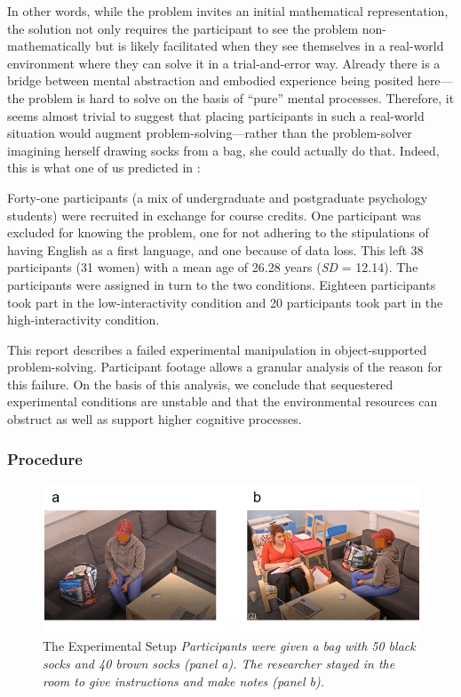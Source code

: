 \documentclass[twocolumn, issue, empirical, authordate,drafn]{jote-new-article}
\begin{document}
In other words, while the problem invites an initial mathematical representation, the solution not only requires the participant to see the problem non-mathematically but is likely facilitated when they see themselves in a real-world environment where they can solve it in a trial-and-error way. Already there is a bridge between mental abstraction and embodied experience being posited here---the problem is hard to solve on the basis of ``pure'' mental processes. Therefore, it seems almost trivial to suggest that placing participants in such a real-world situation would augment problem-solving---rather than the problem-solver imagining herself drawing socks from a bag, she could actually do that. Indeed, this is what one of us predicted in \textcite{Vallee-Tourangeau2020}: 


Forty-one participants (a mix of undergraduate and postgraduate psychology students) were recruited in exchange for course credits. One participant was excluded for knowing the problem, one for not adhering to the stipulations of having English as a first language, and one because of data loss. This left 38 participants (31 women) with a mean age of 26.28 years (\emph{SD} = 12.14). The participants were assigned in turn to the two conditions. Eighteen participants took part in the low-interactivity condition and 20 participants took part in the high-interactivity condition. 

\begin{takeHomeMessage}
This report describes a failed experimental manipulation in object-supported problem-solving. Participant footage allows a granular analysis of the reason for this failure. On the basis of this analysis, we conclude that sequestered experimental conditions are unstable and that the environmental resources can obstruct as well as support higher cognitive processes.
\end{takeHomeMessage}

\subsubsection{Procedure}

\begin{figure}

 \includegraphics[width=\columnwidth]{media/image1.png} 
\caption{The Experimental Setup \hspace{\textwidth}
\emph{Participants were given a bag with 50 black socks and 40 brown socks \emph{(panel a)}. The researcher stayed in the room to give instructions and make notes \emph{(panel b)}.}} 
\label{fig:figure1}
\end{figure}
\end{document}
